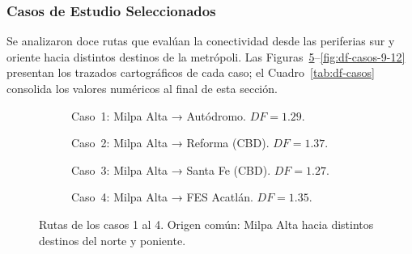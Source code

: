 \subsubsection{Casos de Estudio Seleccionados}
\label{subsubsec:df-casos}

Se analizaron doce rutas que evalúan la conectividad desde las periferias sur y
oriente hacia distintos destinos de la metrópoli. Las
Figuras~\ref{fig:df-casos-1-4}--\ref{fig:df-casos-9-12} presentan los trazados
cartográficos de cada caso; el Cuadro~\ref{tab:df-casos} consolida los valores
numéricos al final de esta sección.

\begin{figure}[H]
    \centering
    \begin{subfigure}[t]{0.48\textwidth}
        \caption{Caso~1: Milpa Alta → Autódromo. $DF = 1.29$.}
        \label{fig:df-c01}
    \end{subfigure}
    \hfill
    \begin{subfigure}[t]{0.48\textwidth}
        \caption{Caso~2: Milpa Alta → Reforma (CBD). $DF = 1.37$.}
        \label{fig:df-c02}
    \end{subfigure}

    \vspace{0.5em}
    \begin{subfigure}[t]{0.48\textwidth}
        \caption{Caso~3: Milpa Alta → Santa Fe (CBD). $DF = 1.27$.}
        \label{fig:df-c03}
    \end{subfigure}
    \hfill
    \begin{subfigure}[t]{0.48\textwidth}
        \caption{Caso~4: Milpa Alta → FES Acatlán. $DF = 1.35$.}
        \label{fig:df-c04}
    \end{subfigure}
    \caption[Casos de estudio del Factor de Desviación: 1–4]{Rutas de los casos 1 al 4.
    Origen común: Milpa Alta hacia distintos destinos del norte y poniente.}
    \label{fig:df-casos-1-4}
\end{figure}

